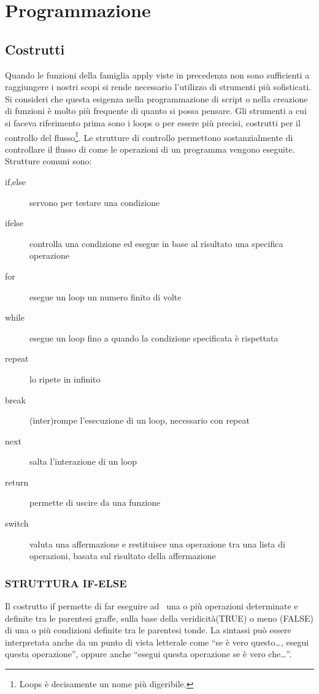\chapter{Programmazione}

\section{Costrutti}
Quando le funzioni della famiglia \textsf{apply} viste in precedenza non sono sufficienti a raggiungere i nostri scopi si rende necessario l'utilizzo di strumenti più sofisticati. Si consideri che questa esigenza nella programmazione di script o nella creazione di funzioni è molto più frequente di quanto si possa pensare.  Gli strumenti a cui si faceva riferimento prima sono i \textsf{loops} o per essere più precisi, costrutti per il controllo del flusso\footnote{\textsf{Loops} è decisamente un nome più digeribile.}.
Le strutture di controllo permettono sostanzialmente di controllare il flusso di come le operazioni di un programma vengono eseguite. Strutture comuni sono:

\begin{description}
\item[if,else] servono per testare una condizione
\item[ifelse] controlla una condizione ed esegue in base al risultato una specifica operazione
\item[for] esegue un loop un numero finito di volte
\item[while] esegue un loop fino a quando la condizione specificata è rispettata
\item[repeat] lo ripete in infinito
\item[break] (inter)rompe l'esecuzione di un loop, necessario con repeat
\item[next] salta l'interazione di un loop
\item[return] permette di uscire da una funzione 
\item[switch] valuta una affermazione e restituisce una operazione tra una lista di operazioni, basata sul risultato della affermazione
\end{description}

\subsection{STRUTTURA IF-ELSE}

Il costrutto \textsf{if} permette di far eseguire ad \erre\ una o più operazioni determinate e definite tra le parentesi graffe, sulla base della veridicità(\textsf{TRUE}) o meno (\textsf{FALSE}) di una o più condizioni definite tra le parentesi tonde. La sintassi può essere interpretata anche da un punto di vista letterale come ``se è vero questo\dots, esegui questa operazione'', oppure anche ``esegui questa operazione se è vero che\dots''.

